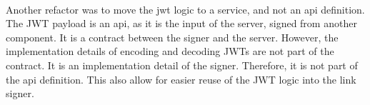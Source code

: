 \paragraph{}
Another refactor was to move the jwt logic to a service, and not an api definition. The JWT payload is an api, as it is the input of the server, signed from another component. It is a contract between the signer and the server. However, the implementation details of encoding and decoding JWTs are not part of the contract. It is an implementation detail of the signer. Therefore, it is not part of the api definition. This also allow for easier reuse of the JWT logic into the link signer.
